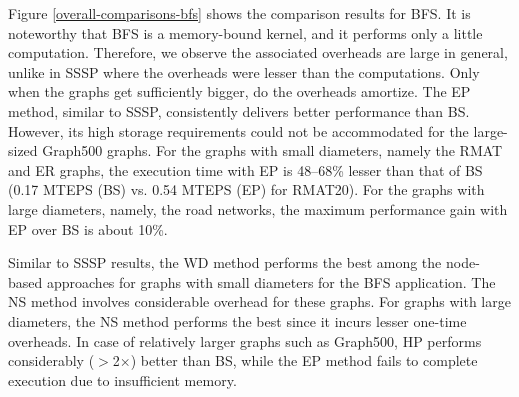 

Figure \ref{overall-comparisons-bfs} shows the comparison results for BFS. It is noteworthy that BFS is a memory-bound kernel, and it performs only a little computation. Therefore, we observe the associated overheads are large in general, unlike in SSSP where the overheads were lesser than the computations. Only when the graphs get sufficiently bigger, do the overheads amortize. The EP method, similar to SSSP, consistently delivers better performance than BS. However, its high storage requirements could not be accommodated for the large-sized Graph500 graphs. For the graphs with small diameters, namely the RMAT and ER graphs, the execution time with EP is 48--68\% lesser than that of BS (0.17 MTEPS (BS) vs. 0.54 MTEPS (EP) for RMAT20). For the graphs with large diameters, namely, the road networks, the maximum performance gain with EP over BS is about 10\%.  

Similar to SSSP results, the WD method performs the best among the node-based approaches for graphs with small diameters for the BFS application. The NS method involves considerable overhead for these graphs. For graphs with large diameters, the NS method performs the best since it incurs lesser one-time overheads. In case of relatively larger graphs such as Graph500, HP performs considerably ($>$2$\times$) better than BS, while the EP method fails
to complete execution due to insufficient memory.

